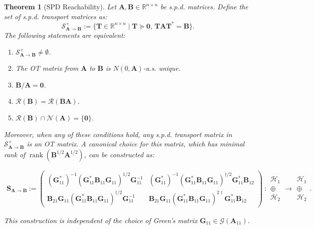 \documentclass[noinfoline]{imsart}\setcounter{tocdepth}{2}
\renewcommand{\b}[1]{\mathbb{#1}} %
\newcommand{\m}[1]{\mathbf{#1}} %
\renewcommand{\c}[1]{\mathcal{#1}} %
\DeclareMathOperator*{\rk}{rank}
\theoremstyle{plain}
\newtheorem{theorem}{Theorem}[section]
\begin{document}
\begin{theorem}[SPD Reachability]\label{thm:spd:sol:sym}
Let $\m{A}, \m{B} \in \b{R}^{n \times n}$ be s.p.d. matrices. Define the set of s.p.d. transport matrices as:
\begin{equation*}
    \c{S}_{\m{A} \to \m{B}}^{+} := \{\m{T} \in \b{R}^{n \times n} \mid \m{T} \succeq \m{0}, \, \m{T} \m{A} \m{T}^{*} = \m{B} \}.
\end{equation*}
The following statements are equivalent:
\begin{enumerate}[leftmargin = *]
    \item $\c{S}_{\m{A} \to \m{B}}^{+} \neq \emptyset$.
    \item The OT matrix from $\m{A}$ to $\m{B}$ is $N(0, \m{A})$-a.s. unique.
    \item $\m{B}/\m{A} = \m{0}$.
    \item $\c{R} (\m{B}) = \c{R}(\m{B} \m{A})$.
    \item $ \c{R}(\m{B}) \cap \c{N}(\m{A}) = \{ \m{0} \}$.
\end{enumerate}

Moreover, when any of these conditions hold, any s.p.d. transport matrix in $\c{S}_{\m{A} \to \m{B}}^{+}$ is an OT matrix. A canonical choice for this matrix, which has minimal rank of $\rk (\m{B}^{1/2} \m{A}^{1/2})$, can be constructed as:
\begin{small}
\begin{align}\label{eq:gen:pusz:fin}
    \m{S}_{\m{A} \to \m{B}} :=
    \begin{pmatrix}
    (\m{G}_{11}^{*})^{-1} (\m{G}_{11}^{*} \m{B}_{11} \m{G}_{11})^{1/2} \m{G}_{11}^{-1} & (\m{G}_{11}^{*})^{-1} (\m{G}_{11}^{*} \m{B}_{11} \m{G}_{11})^{\dagger/2} \m{G}_{11}^{*} \m{B}_{12} \\
    \m{B}_{21} \m{G}_{11} (\m{G}_{11}^{*} \m{B}_{11} \m{G}_{11})^{\dagger/2} \m{G}_{11}^{-1} & \m{B}_{21} \m{G}_{11} (\m{G}_{11}^{*} \m{B}_{11} \m{G}_{11})^{2 \dagger} \m{G}_{11}^{*}  \m{B}_{12}
    \end{pmatrix}
    \    :
    \begin{array}{c}
    \c{H}_{1} \\
    \oplus \\
    \c{H}_{2}
    \end{array}
    \rightarrow
    \begin{array}{c}
    \c{H}_{1} \\
    \oplus \\
    \c{H}_{2}
    \end{array}.
\end{align}    
\end{small}
This construction is independent of the choice of Green's matrix $\m{G}_{11} \in \c{G}(\m{A}_{11})$.
\end{theorem}
\end{document}
